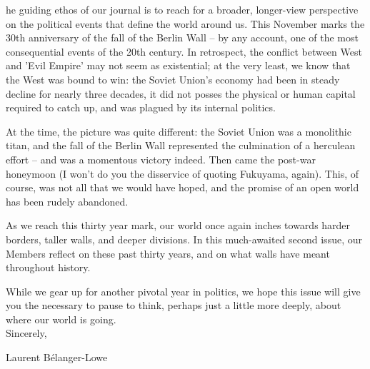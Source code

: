 

he guiding ethos of our journal is to reach for a broader, longer-view perspective on the political events that define the world around us. This November marks the 30th anniversary of the fall of the Berlin Wall -- by any account, one of the most consequential events of the 20th century. In retrospect, the conflict between West and 'Evil Empire' may not seem as existential; at the very least, we know that the West was bound to win: the Soviet Union's economy had been in steady decline for nearly three decades, it did not posses the physical or human capital required to catch up, and was plagued by its internal politics.  

At the time, the picture was quite different: the Soviet Union was a monolithic titan, and the fall of the Berlin Wall represented the culmination of a herculean effort -- and was a momentous victory indeed. Then came the post-war honeymoon (I won't do you the disservice of quoting Fukuyama, again). This, of course, was not all that we would have hoped, and the promise of an open world has been rudely abandoned. 

As we reach this thirty year mark, our world once again inches towards harder borders, taller walls, and deeper divisions. In this much-awaited second issue, our Members reflect on these past thirty years, and on what walls have meant throughout history. 

While we gear up for another pivotal year in politics, we hope this issue will give you the necessary to pause to think, perhaps just a little more deeply, about where our world is going. \\

Sincerely,

Laurent B\'elanger-Lowe